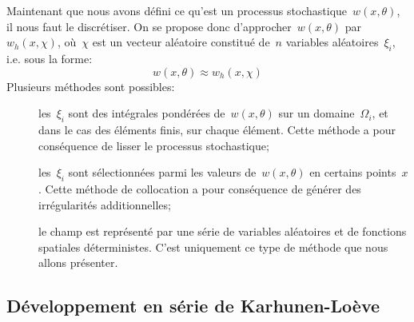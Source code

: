Maintenant que nous avons défini ce qu'est un processus stochastique~$w(x,\theta)$, il nous faut le discrétiser.
On se propose donc d'approcher~$w(x,\theta)$ par~$w_h(x,\chi)$, où~$\chi$ est un vecteur aléatoire constitué de~$n$ variables aléatoires~$\xi_i$, i.e. sous la forme:
\begin{equation}
w(x,\theta)\approx w_h(x,\chi)
\end{equation}
Plusieurs méthodes sont possibles:
\begin{description}
   \item[] les~$\xi_i$ sont des intégrales pondérées de~$w(x,\theta)$ sur un domaine~$\Omega_i$, et dans le cas des éléments finis, sur chaque élément. Cette méthode a pour conséquence de lisser le processus stochastique;
   \item[] les~$\xi_i$ sont sélectionnées parmi les valeurs de~$w(x,\theta)$ en certains points~$x$. Cette méthode de collocation a pour conséquence de générer des irrégularités additionnelles;
   \item[] le champ est représenté par une série de variables aléatoires et de fonctions spatiales déterministes. C'est uniquement ce type de méthode que nous allons présenter.
\end{description}


\medskip\ifVersionDuDocEstVincent\else\newpage\fi
\subsection{Développement en série de Karhunen-Loève}

